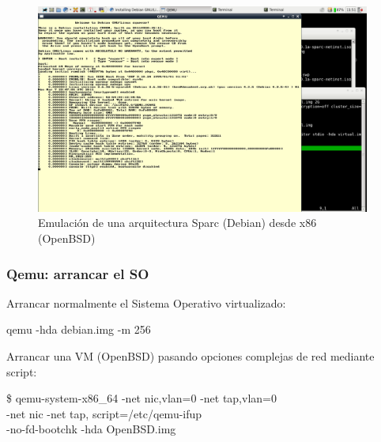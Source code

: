\documentclass{beamer}
\begin{document}

\begin{frame}

\begin{figure}
  \centering
	\includegraphics[width=11cm,clip=false]{figs/qemu-sparc-install.png}
  \caption{\scriptsize{Emulación de una arquitectura Sparc (Debian) desde x86 (OpenBSD)}}
\end{figure}

\end{frame}




\begin{frame}
\frametitle{Qemu: arrancar el SO}

Arrancar normalmente el Sistema Operativo virtualizado:
\begin{semiverbatim}
qemu -hda debian.img -m 256
\end{semiverbatim}

Arrancar una VM (OpenBSD) pasando opciones complejas de red mediante script:
\begin{semiverbatim}
\small
\$ qemu-system-x86\_64 -net nic,vlan=0 -net tap,vlan=0\\

\hspace{10mm} -net nic -net tap, \alert{script=/etc/qemu-ifup} \\ 

\hspace{10mm} -no-fd-bootchk -hda OpenBSD.img

\end{semiverbatim}
\end{frame}
\end{document}
